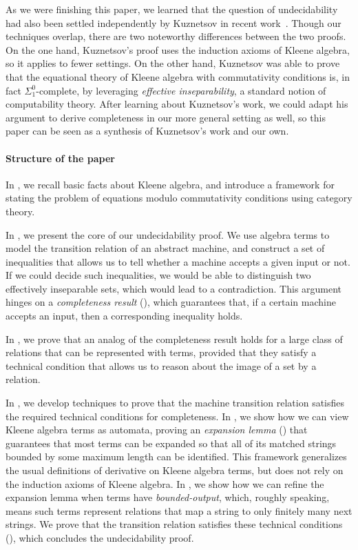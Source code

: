 \documentclass[a4paper,UKenglish,cleveref, autoref, thm-restate]{lipics-v2021}
\begin{document}
As we were finishing this paper, we learned that the question of undecidability
had also been settled independently by Kuznetsov in recent
work~\cite{Kuznetsov23}.  Though our techniques overlap, there are two
noteworthy differences between the two proofs.  On the one hand, Kuznetsov's
proof uses the induction axioms of Kleene algebra, so it applies to fewer
settings. On the other hand, Kuznetsov was able to prove that the equational
theory of Kleene algebra with commutativity conditions is, in fact
$ \Sigma _1^0$-complete, by leveraging \emph{effective inseparability}, a standard
notion of computability theory.  After learning about Kuznetsov's work, we could
adapt his argument to derive completeness in our more general setting as well,
so this paper can be seen as a synthesis of Kuznetsov's work and our own.

\paragraph*{Structure of the paper}
In , we recall basic facts about Kleene algebra, and
introduce a framework for stating the problem of equations modulo commutativity
conditions using category theory.

In , we present the core of our undecidability proof. We use
algebra terms to model the transition relation of an abstract machine, and
construct a set of inequalities that allows us to tell whether a machine accepts
a given input or not.  If we could decide such inequalities, we would be able to
distinguish two effectively inseparable sets, which would lead to a contradiction.
This argument hinges on a \emph{completeness result} (),
which guarantees that, if a certain machine accepts an input, then a
corresponding inequality holds.

In , we prove that an
analog of the completeness result holds for a large class of relations that can
be represented with terms, provided that they satisfy a technical condition that
allows us to reason about the image of a set by a relation.

In , we develop techniques to prove that the
machine transition relation satisfies the required technical conditions for
completeness. In , we show how we can view Kleene algebra
terms as automata, proving an \emph{expansion lemma} () that
guarantees that most terms can be expanded so that all of its matched strings
bounded by some maximum length can be identified.  This framework generalizes
the usual definitions of derivative on Kleene algebra terms, but does not rely
on the induction axioms of Kleene algebra.  In , we
show how we can refine the expansion lemma when terms have
\emph{bounded-output}, which, roughly speaking, means such terms represent
relations that map a string to only finitely many next strings.  We prove that
the transition relation satisfies these technical conditions
(), which concludes the undecidability proof.
\end{document}
